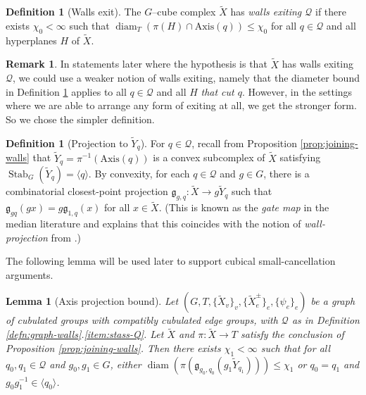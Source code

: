\documentclass[11pt,oneside]{amsart}
\newcounter{ax}
\newtheorem{lem}[thm]{Lemma}
\theoremstyle{definition}
\newtheorem{defn}[thm]{Definition}
\newtheorem{rem}[thm]{Remark}
\DeclareMathOperator{\stabilizer}{Stab}
\DeclareMathOperator{\diam}{diam}
\newcommand{\gate}{\mathfrak g}
\newcommand{\axis}{\mathrm{Axis}}
\begin{document}
\begin{defn}[Walls exit]\label{defn:walls-exit}
  The $G$--cube complex $\widetilde X$ has \emph{walls exiting $\mathcal Q$} if there exists $\chi_0<\infty$ such that $\diam_T(\pi(H)\cap \axis(q))\leq \chi_0$ for all $q\in\mathcal Q$ and all hyperplanes $H$ of $\widetilde X$.
\end{defn}

\begin{rem}\label{rem:better-exits}
In statements later where the hypothesis is that $\widetilde X$ has walls exiting $\mathcal Q$, we could use a weaker notion of walls exiting, namely that the diameter bound in Definition \ref{defn:walls-exit} applies to all $q\in\mathcal Q$ and all $H$ \emph{that cut $q$}.  However, in the settings where we are able to arrange any form of exiting at all, we get the stronger form.  So we chose the simpler definition.
\end{rem}


\begin{defn}[Projection to $\widetilde Y_q$]\label{defn:axis-projection}
 For $q\in\mathcal Q$, recall from Proposition \ref{prop:joining-walls} that $\widetilde Y_q=\pi^{-1}(\axis(q))$ is a convex subcomplex of $\widetilde X$ satisfying $\stabilizer_G(\widetilde Y_q)=\langle q\rangle$.  By convexity, for each $q\in\mathcal Q$ and $g\in G$, there is a combinatorial closest-point projection $\gate_{g,q}:\widetilde X\to g\widetilde Y_q$ such that $\gate_{gq}(gx)=g\gate_{1,q}(x)$ for all $x\in\widetilde X$.  (This is known as the \emph{gate map} in the median literature and \cite[Rem. 3.5, Rem. 3.6]{ArzhantsevaHagen} explains that this coincides with the notion of \emph{wall-projection} from \cite{HW:comb}.)
\end{defn}

The following lemma will be used later to support cubical small-cancellation arguments.

\begin{lem}[Axis projection bound]\label{lem:axis-subcomplex-overlap}
Let $(G,T,\{\widetilde X_v\}_v,\{\widetilde X_e^{\pm}\}_e,\{\psi_e\}_e)$ be a graph of cubulated groups with compatibly cubulated edge groups, with $\mathcal Q$ as in Definition \ref{defn:graph-walls}.\eqref{item:stass-Q}.  Let $\widetilde X$  and $\pi:\widetilde X\to T$ satisfy the conclusion of Proposition \ref{prop:joining-walls}.  Then there exists $\chi_1<\infty$ such that for all $q_0,q_1\in\mathcal Q$ and $g_0,g_1\in G$, either
$\diam(\pi(\gate_{g_0,q_0}(g_1\widetilde Y_{q_1})))\leq \chi_1$
or $q_0=q_1$ and $g_0g_1^{-1}\in\langle q_0\rangle$.
\end{lem}
\end{document}
